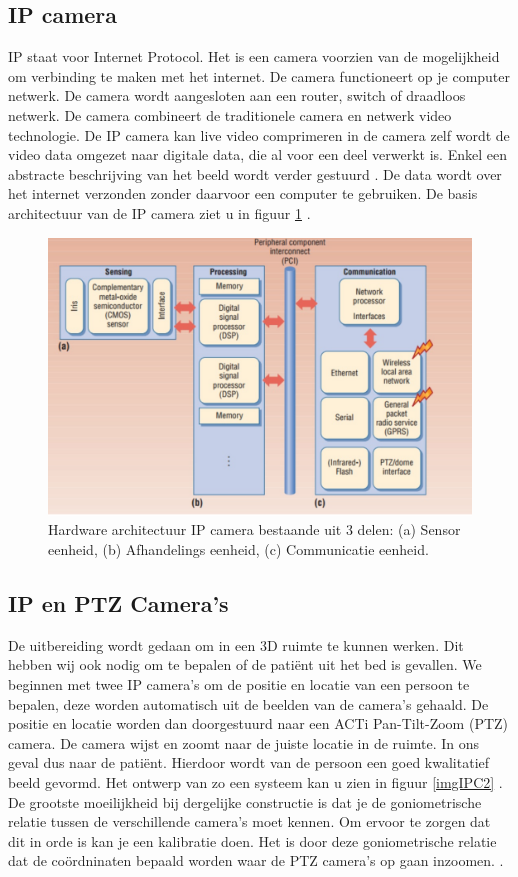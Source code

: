 \subsection{IP camera}
\label{refIPC}
IP staat voor Internet Protocol. Het is een camera voorzien van de mogelijkheid om verbinding te maken met het internet. De camera functioneert op je computer netwerk. De camera wordt aangesloten aan een router, switch of draadloos netwerk.  De camera combineert de traditionele camera en netwerk video technologie. De IP camera kan live video comprimeren in de camera zelf wordt de video data omgezet naar digitale data, die al voor een deel verwerkt is. Enkel een abstracte beschrijving van het beeld wordt verder gestuurd \cite{bibIPC3}.  De data wordt over het internet verzonden zonder daarvoor een computer te gebruiken. De basis architectuur van de IP camera ziet u in figuur \ref{imgIPC} \cite{bibVTC2}.
\begin{figure}[hbp]
	\includegraphics[scale=0.55]{ArchitectuurIPCamera}
	\caption{Hardware architectuur IP camera bestaande uit 3 delen: (a) Sensor eenheid, (b) Afhandelings eenheid, (c) Communicatie eenheid.}
	\label{imgIPC}
\end{figure}
 

\subsection{IP en PTZ Camera's}
\label{refIPC2}
De uitbereiding wordt gedaan om in een 3D ruimte te kunnen werken. Dit hebben wij ook nodig om te bepalen of de pati\"ent uit het bed is gevallen. We beginnen met twee IP camera's om de positie en locatie van een persoon te bepalen, deze worden automatisch uit de beelden van de camera's gehaald. De positie en locatie worden dan doorgestuurd naar een ACTi Pan-Tilt-Zoom (PTZ) camera. De camera wijst en zoomt naar de juiste locatie in de ruimte. In ons geval dus naar de pati\"ent. Hierdoor wordt van de persoon een goed kwalitatief beeld gevormd. Het ontwerp van zo een systeem kan u zien in figuur \ref{imgIPC2} \cite{bibIPC}. De grootste moeilijkheid bij dergelijke constructie is dat je de goniometrische relatie tussen de verschillende camera's moet kennen. Om ervoor te zorgen dat dit in orde is kan je een kalibratie doen. Het is door deze goniometrische relatie dat de co\"ordninaten bepaald worden waar de PTZ camera's op gaan inzoomen.  \cite{bibVTC3}.

